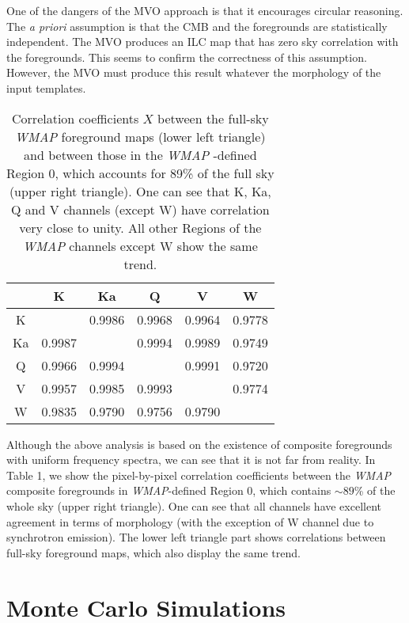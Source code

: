 \documentclass{emulateapj}
\def\wmap{{\sl WMAP }}
\begin{document}
One of the dangers of the MVO approach is that it encourages
circular reasoning. The {\it a priori} assumption is that the CMB
and the foregrounds are statistically independent. The MVO produces
an ILC map that has zero sky correlation with the foregrounds. This
seems to confirm the correctness of this assumption.  However, the
MVO must produce this result whatever the morphology of the input
templates.


\begin{table}
\begin{center}
\begin{tabular}{|c|c|c|c|c|c|} \hline
      &  K      &  Ka   &  Q       &  V     &  W      \\  \hline
K     &         & 0.9986 & 0.9968  & 0.9964 & 0.9778  \\  \hline
Ka    & 0.9987  &        & 0.9994  & 0.9989 & 0.9749  \\  \hline
Q     & 0.9966  & 0.9994 &         & 0.9991 & 0.9720  \\  \hline
V     & 0.9957  & 0.9985 & 0.9993  &        & 0.9774  \\  \hline
W     & 0.9835  & 0.9790 & 0.9756  & 0.9790 &         \\  \hline
\end{tabular}
\end{center}
\caption{Correlation coefficients $X$ between the full-sky \wmap
foreground maps (lower left triangle) and between those in the
\wmap-defined Region 0, which accounts for 89\% of the full sky
(upper right triangle). One can see that K, Ka, Q and V channels
(except W) have correlation very close to unity. All other Regions
of the \wmap channels except W show the same trend.}
\label{xcorrtable}
\end{table}


Although the above analysis is based on the existence of composite
foregrounds with uniform frequency spectra, we can see that it is
not far from reality. In Table 1, we show the pixel-by-pixel
correlation coefficients between the \wmap composite foregrounds in
{\it WMAP}-defined Region 0, which contains $\sim 89$\% of the whole
sky (upper right triangle). One can see that all channels have
excellent agreement in terms of morphology (with the exception of W
channel due to synchrotron emission). The lower left triangle part shows
correlations between full-sky foreground maps, which also display the
same trend.

\section{Monte Carlo Simulations}
\end{document}
